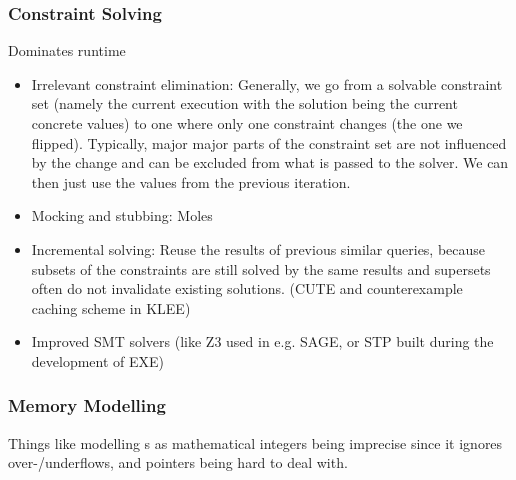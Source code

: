 \documentclass{article}
\begin{document}
\subsubsection{Constraint Solving}
Dominates runtime
\begin{itemize}
    \item Irrelevant constraint elimination: Generally, we go from a solvable constraint set (namely the current execution with the solution being the current concrete values) to one where only one constraint changes (the one we flipped). Typically, major major parts of the constraint set are not influenced by the change and can be excluded from what is passed to the solver. We can then just use the values from the previous iteration.
    \item Mocking and stubbing: Moles\cite{Moles}
    \item Incremental solving: Reuse the results of previous similar queries, because subsets of the constraints are still solved by the same results and supersets often do not invalidate existing solutions. (CUTE\cite{CUTE} and counterexample caching scheme in KLEE\cite{KLEE})
    \item Improved SMT solvers (like Z3\cite{Z3} used in e.g. SAGE\cite{SAGE}, or STP\cite{STP} built during the development of EXE\cite{EXE})
\end{itemize}

\subsubsection{Memory Modelling}
Things like modelling s as mathematical integers being imprecise since it ignores over-/underflows, and pointers being hard to deal with. \cite{ReviewThreeDecades}
\end{document}

